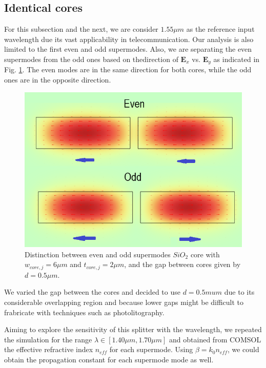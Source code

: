 \documentclass[conference, a4paper]{IEEEtran}
\begin{document}
\subsection{Identical cores}
\label{subsec:splitter_identical}

For this subsection and the next, we are consider $1.55\mu m$ as the reference input wavelength due its vast applicability in telecommunication. Our analysis is also limited to the first even and odd supermodes. Also, we are separating the even supermodes from the odd ones based on thedirection of $\mathbf{E}_x$ vs. $\mathbf{E}_y$ as indicated in Fig. \ref{fig:splitter_identical_parity}. The even modes are in the same direction for both cores, while the odd ones are in the opposite direction.

\begin{figure}[H]
    \centering
    \includegraphics[scale=0.4]{even_odd_supermodes.png}
    \caption{Distinction between even and odd supermodes $SiO_2$ core with $w_{core, j} = 6\mu m$ and $t_{core, j} = 2\mu m$, and the gap between cores given by $d = 0.5\mu m$.}
    \label{fig:splitter_identical_parity}
\end{figure} 

We varied the gap between the cores and decided to use $d = 0.5mu m$ due to its considerable overlapping region and because lower gaps might be difficult to frabricate with techniques such as photolitography.


Aiming to explore the sensitivity of this splitter with the wavelength, we repeated the simulation for the range $\lambda \in [1.40 \mu m, 1.70 \mu m]$ and obtained from COMSOL the effective refractive index $n_{eff}$ for each supermode. Using $\beta = k_0 n_{eff}$, we could obtain the propagation constant for each supermode mode as well.
\end{document}
